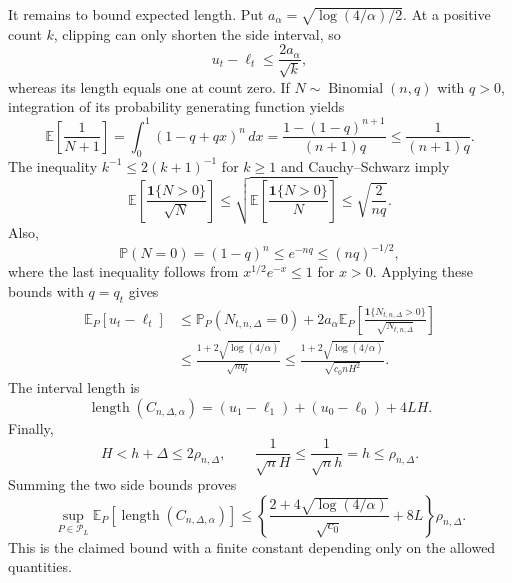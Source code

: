 It remains to bound expected length.  Put \(a_\alpha=\sqrt{\log(4/\alpha)/2}\).  At a positive count \(k\), clipping can only shorten the side interval, so
\[
 u_t-\ell_t\leq\frac{2a_\alpha}{\sqrt k},
\]
whereas its length equals one at count zero.  If \(N\sim\operatorname{Binomial}(n,q)\) with \(q>0\), integration of its probability generating function yields
\[
 \mathbb E\!\left[\frac1{N+1}\right]
 =\int_0^1(1-q+qx)^n\,dx
 =\frac{1-(1-q)^{n+1}}{(n+1)q}
 \leq\frac1{(n+1)q}.
\]
The inequality \(k^{-1}\leq2(k+1)^{-1}\) for \(k\geq1\) and Cauchy--Schwarz imply
\[
 \mathbb E\!\left[\frac{\mathbf1\{N>0\}}{\sqrt N}\right]
 \leq\sqrt{\mathbb E\!\left[\frac{\mathbf1\{N>0\}}N\right]}
 \leq\sqrt{\frac2{nq}}.
\]
Also,
\[
 \mathbb P(N=0)=(1-q)^n\leq e^{-nq}\leq(nq)^{-1/2},
\]
where the last inequality follows from \(x^{1/2}e^{-x}\leq1\) for \(x>0\).  Applying these bounds with \(q=q_t\) gives
\[
 \begin{aligned}
 \mathbb E_P[u_t-\ell_t]
 &\leq \mathbb P_P(N_{t,n,\Delta}=0)
 +2a_\alpha\mathbb E_P\!\left[
 \frac{\mathbf1\{N_{t,n,\Delta}>0\}}{\sqrt{N_{t,n,\Delta}}}
 \right]\\
 &\leq\frac{1+2\sqrt{\log(4/\alpha)}}{\sqrt{nq_t}}
 \leq\frac{1+2\sqrt{\log(4/\alpha)}}{\sqrt{c_0nH^2}}.
 \end{aligned}
\]
The interval length is
\[
 \operatorname{length}(C_{n,\Delta,\alpha})
 =(u_1-\ell_1)+(u_0-\ell_0)+4LH.
\]
Finally,
\[
 H<h+\Delta\leq2\rho_{n,\Delta},
 \qquad
 \frac1{\sqrt nH}\leq\frac1{\sqrt nh}=h\leq\rho_{n,\Delta}.
\]
Summing the two side bounds proves
\[
 \sup_{P\in\mathcal P_L}\mathbb E_P[\operatorname{length}(C_{n,\Delta,\alpha})]
 \leq
 \left\{
 \frac{2+4\sqrt{\log(4/\alpha)}}{\sqrt{c_0}}+8L
 \right\}\rho_{n,\Delta}.
\]
This is the claimed bound with a finite constant depending only on the allowed quantities.